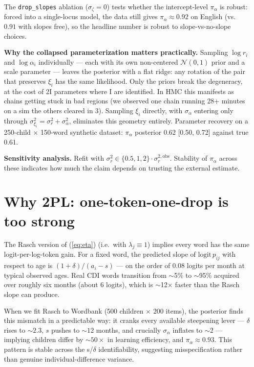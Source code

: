 \documentclass[11pt]{article}
\newcommand{\Norm}{\mathcal{N}}
\begin{document}
The \texttt{drop\_slopes} ablation (\(\sigma_\zeta = 0\)) tests
whether the intercept-level \(\pi_\alpha\) is robust: forced into a
single-locus model, the data still gives \(\pi_\alpha \approx 0.92\)
on English (vs.\ \(0.91\) with slopes free), so the headline number
is robust to slope-vs-no-slope choices.

\textbf{Why the collapsed parameterization matters practically.} Sampling
\(\log r_i\) and \(\log \alpha_i\) individually — each with its own
non-centered \(\Norm(0, 1)\) prior and a scale parameter — leaves the
posterior with a flat ridge: any rotation of the pair that preserves
\(\xi_i\) has the same likelihood. Only the priors break the degeneracy,
at the cost of 2I parameters where I are identified. In HMC this
manifests as chains getting stuck in bad regions (we observed one chain
running 28+ minutes on a sim the others cleared in 3). Sampling
\(\xi_i\) directly, with \(\sigma_\alpha\) entering only through
\(\sigma_{\xi_i}^2 = \sigma_r^2 + \sigma_\alpha^2\), eliminates this
geometry entirely. Parameter recovery on a 250-child \(\times\) 150-word
synthetic dataset: \(\pi_\alpha\) posterior 0.62 [0.50, 0.72] against
true 0.61.

\textbf{Sensitivity analysis.} Refit with
\(\sigma_r^2 \in \{0.5, 1, 2\} \cdot \sigma_r^{2,\text{obs}}\).
Stability of \(\pi_\alpha\) across these indicates how much the claim
depends on trusting the external estimate.

\section{Why 2PL: one-token-one-drop is too strong}
\label{sec:twopl}

The Rasch version of (\ref{eq:eta}) (i.e.\ with \(\lambda_j \equiv 1\))
implies every word has the same logit-per-log-token gain. For a fixed
word, the predicted slope of \(\mathrm{logit}\,p_{ij}\) with respect to
age is \((1+\delta)/(a_i - s)\) — on the order of \(0.08\) logits per
month at typical observed ages. Real CDI words transition from
\(\sim\)5\% to \(\sim\)95\% acquired over roughly six months (about 6
logits), which is \(\sim\)12\(\times\) faster than the Rasch slope can
produce.

When we fit Rasch to Wordbank (500 children \(\times\) 200 items), the
posterior finds this mismatch in a predictable way: it cranks every
available steepening lever — \(\delta\) rises to \(\sim 2.3\), \(s\)
pushes to \(\sim 12\) months, and crucially \(\sigma_\alpha\) inflates
to \(\sim 2\) — implying children differ by \(\sim 50\times\) in
learning efficiency, and \(\pi_\alpha \approx 0.93\). This pattern is
stable across the s/\(\delta\) identifiability, suggesting misspecification
rather than genuine individual-difference variance.
\end{document}

